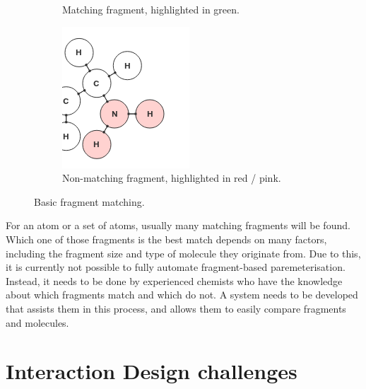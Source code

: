 \begin{figure}[h!]
\begin{subfigure}[t]{0.29\textwidth}
\caption{Matching fragment, highlighted in green.}
\end{subfigure}%
\qquad
\begin{subfigure}[t]{0.29\textwidth}
\centering
\includegraphics[width=\textwidth]{img/match_3.png}
\caption{Non-matching fragment, highlighted in red / pink.}
\end{subfigure}
\caption{Basic fragment matching.}
\end{figure}

For an atom or a set of atoms, usually many matching fragments will be found. Which one of those fragments is the best match depends on many factors, including the fragment size and type of molecule they originate from. Due to this, it is currently not possible to fully automate fragment-based paremeterisation. Instead, it needs to be done by experienced chemists who have the knowledge about which fragments match and which do not. A system needs to be developed that assists them in this process, and allows them to easily compare fragments and molecules.


\section{Interaction Design challenges}
\nlipsum



